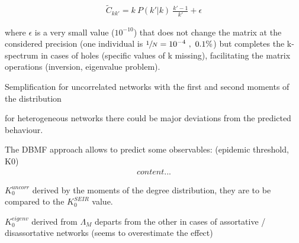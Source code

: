 \documentclass[DIV=12, BCOR=0pt]{scrartcl}  %
\begin{document}
  \begin{align}
		\tilde{C}_{kk'} = k \ P(k'|k) \ \frac{k' - 1}{k'} + \epsilon
  \end{align}

	where $\epsilon$ is a very small value ($10^{-10}$) that does not change the matrix at the considered precision (one individual is $ \sfrac{1}{N} = 10^{-4} \ , \ 0.1 \%$) but completes the k-spectrum in cases of holes (specific values of k missing), facilitating the matrix operations (inversion, eigenvalue problem).

  
  
 
  Semplification for uncorrelated networks with the first and second moments of the distribution
  
  for heterogeneous networks there could be major deviations from the predicted behaviour. 
 
 
  
  
  The DBMF approach allows to predict some observables: (epidemic threshold, K0)
  \begin{align}
  	content...%
  \end{align}
	
	$K_0^{uncorr}$ derived by the moments of the degree distribution, they are to be compared to the $K_0^{SEIR}$ value.
	
	$K_0^{eigenv}$ derived from $\Lambda_M$ departs from the other in cases of assortative / disassortative networks (seems to overestimate the effect)
	
\end{document}
